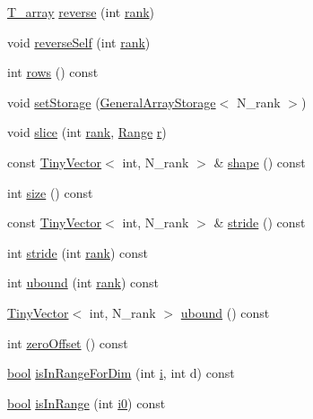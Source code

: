 \begin{DoxyCompactItemize}
\item 
\hyperlink{classArray_a6a3d9b6a214107a10df219091801f1e0}{T\+\_\+array} \hyperlink{classArray_a718822d70c6091db9cb42fc7d06f9040}{reverse} (int \hyperlink{classArray_a1563c492c1be9d9b95a3f53d9cd89fae}{rank})
\item 
void \hyperlink{classArray_a7bc91c4e6b2e77e846ad72f190218a19}{reverse\+Self} (int \hyperlink{classArray_a1563c492c1be9d9b95a3f53d9cd89fae}{rank})
\item 
int \hyperlink{classArray_aaae7a86f1c37f1ad4c53fc399a52e9ee}{rows} () const 
\item 
void \hyperlink{classArray_a338c42b0e31221626c6691aa3754f8d2}{set\+Storage} (\hyperlink{classGeneralArrayStorage}{General\+Array\+Storage}$<$ N\+\_\+rank $>$)
\item 
void \hyperlink{classArray_ad0d4f12effc963adb6806e426c144d32}{slice} (int \hyperlink{classArray_a1563c492c1be9d9b95a3f53d9cd89fae}{rank}, \hyperlink{classRange}{Range} \hyperlink{indexexpr_8h_ac434fd11cc2493608d8d91424d60c17e}{r})
\item 
const \hyperlink{classTinyVector}{Tiny\+Vector}$<$ int, N\+\_\+rank $>$ \& \hyperlink{classArray_aab2fe0a092fc7acfcdbac8e24dfc1252}{shape} () const 
\item 
int \hyperlink{classArray_ab4d95ef442c6bf51193f82b06533fddd}{size} () const 
\item 
const \hyperlink{classTinyVector}{Tiny\+Vector}$<$ int, N\+\_\+rank $>$ \& \hyperlink{classArray_ad8f8e0b4804530717a7fb4fe4c434d29}{stride} () const 
\item 
int \hyperlink{classArray_ac060812c86dee13181c65be076e7d0c6}{stride} (int \hyperlink{classArray_a1563c492c1be9d9b95a3f53d9cd89fae}{rank}) const 
\item 
int \hyperlink{classArray_a799c0842a3880e9bdb9bff8982a160d4}{ubound} (int \hyperlink{classArray_a1563c492c1be9d9b95a3f53d9cd89fae}{rank}) const 
\item 
\hyperlink{classTinyVector}{Tiny\+Vector}$<$ int, N\+\_\+rank $>$ \hyperlink{classArray_a84ea6af8156a3b36e10f1fa33df50256}{ubound} () const 
\item 
int \hyperlink{classArray_af3fa33b513aea465f6ce63da56443d46}{zero\+Offset} () const 
\item 
\hyperlink{compiler_8h_abb452686968e48b67397da5f97445f5b}{bool} \hyperlink{classArray_a682cb0bb827cf05338782479591a651f}{is\+In\+Range\+For\+Dim} (int \hyperlink{indexexpr_8h_aabd77643995707c185e95c8cb2782c81}{i}, int d) const 
\item 
\hyperlink{compiler_8h_abb452686968e48b67397da5f97445f5b}{bool} \hyperlink{classArray_a245c73e8d90b746d4b91aa943be1043f}{is\+In\+Range} (int \hyperlink{cephes_8h_aacd2643d920288e61be16787561a4514}{i0}) const 

\end{DoxyCompactItemize}
